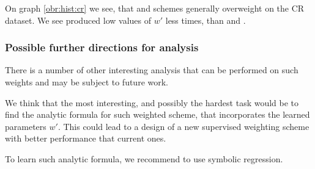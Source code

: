     On graph \ref{obr:hist:cr} we see, that  and  schemes generally overweight on the CR dataset.
    We see  produced low values of $w'$ less times, than  and .
    
    \subsubsection{Possible further directions for analysis}
    
    There is a number of other interesting analysis that can be performed on such weights and may be subject to future work.
    
    We think that the most interesting, and possibly the hardest task would be to find the analytic formula for such weighted scheme, that incorporates the learned parameters $w'$. 
    This could lead to a design of a new supervised weighting scheme with better performance that current ones.
    
    To learn such analytic formula, we recommend to use symbolic regression.
